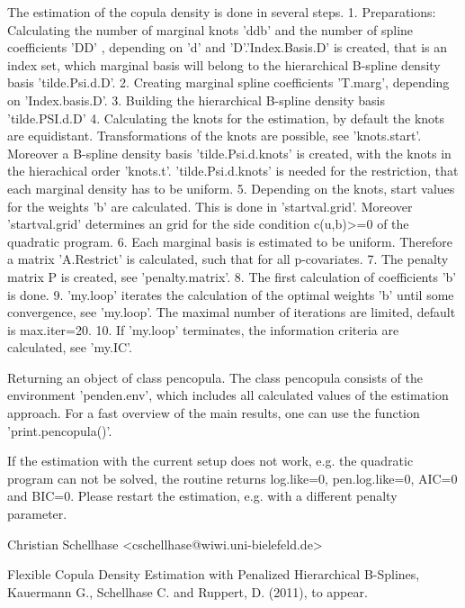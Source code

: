 \documentclass[a4paper]{book}
\begin{document}
\begin{Details}\relax
The estimation of the copula density is done in several steps.
1. Preparations: Calculating the number of marginal knots 'ddb' and the
number of spline coefficients 'DD' , depending on 'd' and
'D'.'Index.Basis.D' is created, that is an index set,
which marginal basis will belong to the hierarchical B-spline density
basis 'tilde.Psi.d.D'.
2. Creating marginal spline coefficients 'T.marg', depending on
'Index.basis.D'.
3. Building the hierarchical B-spline density basis 'tilde.PSI.d.D'
4. Calculating the knots for the estimation, by default the knots are
equidistant. Transformations of the knots are possible, see
'knots.start'. Moreover a B-spline density basis 'tilde.Psi.d.knots'
is created, with the knots in the hierachical order
'knots.t'. 'tilde.Psi.d.knots' is needed for the restriction, that
each marginal density has to be uniform.
5. Depending on the knots, start values for the weights 'b' are
calculated. This is done in 'startval.grid'. Moreover 'startval.grid'
determines an grid for the side condition c(u,b)>=0 of the quadratic
program.
6. Each marginal basis is estimated to be uniform. Therefore a matrix
'A.Restrict' is calculated, such that 
for all p-covariates.
7. The penalty matrix P is created, see 'penalty.matrix'.
8. The first calculation of coefficients 'b' is done.
9. 'my.loop' iterates the calculation of the optimal weights 'b' until
some convergence, see 'my.loop'. The maximal number of iterations are
limited, default is max.iter=20.
10. If 'my.loop' terminates, the information criteria are calculated,
see 'my.IC'.
\end{Details}
%
\begin{Value}
Returning an object of class pencopula. The class pencopula consists of
the environment 'penden.env', which includes all calculated values of
the estimation approach.
For a fast overview of the main results, one can use the function 'print.pencopula()'.
\end{Value}
%
\begin{Note}\relax
If the estimation with the current setup does not work, e.g. the
quadratic program can not be solved, the routine returns log.like=0, pen.log.like=0,
AIC=0 and BIC=0. Please restart the estimation, e.g. with a different
penalty parameter.
\end{Note}
%
\begin{Author}\relax
Christian Schellhase <cschellhase@wiwi.uni-bielefeld.de>
\end{Author}
%
\begin{References}\relax
Flexible Copula Density Estimation with Penalized
Hierarchical B-Splines, Kauermann G., Schellhase C. and Ruppert, D. (2011), to appear.
\end{References}
\end{document}
